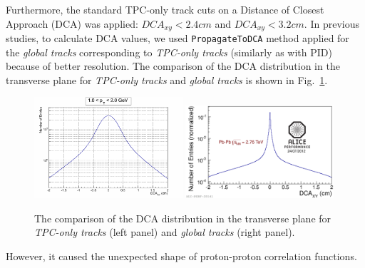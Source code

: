 Furthermore, the standard TPC-only track cuts on a Distance of Closest Approach (DCA) was applied: $DCA_{xy} < 2.4 cm$ and  $DCA_{xy} < 3.2 cm$.
In previous studies, to calculate DCA values, we used \verb|PropagateToDCA| method applied for the \emph{global tracks} corresponding to \emph{TPC-only tracks} (similarly as with PID) because of better resolution. The comparison of the DCA distribution in the transverse plane for \emph{TPC-only tracks} and \emph{global tracks} is shown in Fig.~\ref{dca}.
\begin{figure}%
  \centering
  \includegraphics[width=0.49\textwidth]{DCAxyFailProX_PP_tpconly}
  \includegraphics[width=0.49\textwidth]{2012-Jul-25-DCAxyData}
  \caption{The comparison of the DCA distribution in the transverse plane for \emph{TPC-only tracks} (left panel) and \emph{global tracks} (right panel).}
  \label{dca}
\end{figure}

However, it caused the unexpected shape of proton-proton correlation functions.

